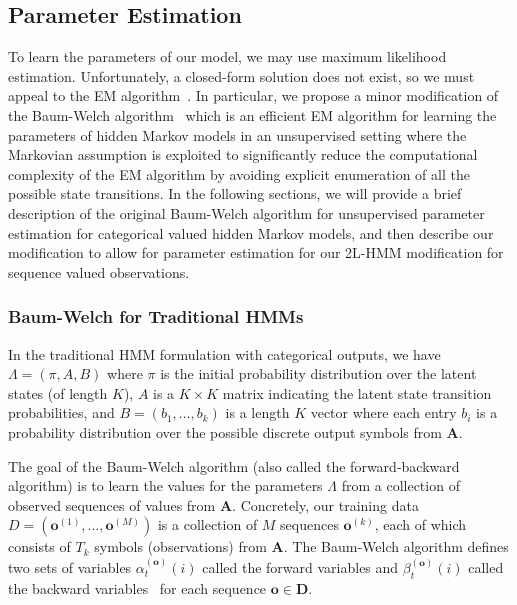 \subsection{Parameter Estimation}
\label{sec:param-estimation}
To learn the parameters of our model, we may use maximum
likelihood estimation. Unfortunately, a closed-form solution does not
exist, so we must appeal to the EM algorithm~\cite{Dempster:1977:JRSS}. In
particular, we propose a minor modification of the Baum-Welch
algorithm~\cite{Rabiner:1990:RSR} which is an efficient EM algorithm
for learning the parameters of
hidden Markov models in an unsupervised setting where the Markovian assumption is exploited
 to significantly reduce the computational complexity of the EM algorithm by avoiding explicit enumeration of all the possible state transitions.  In the following sections,
we will provide a brief description of the original Baum-Welch algorithm
for unsupervised parameter estimation for categorical valued hidden Markov
models, and then describe our modification to allow for parameter
estimation for our 2L-HMM modification for sequence valued observations.

\subsubsection{Baum-Welch for Traditional HMMs}
In the traditional HMM formulation with categorical outputs, we have
$\Lambda = (\pi, A, B)$ where $\pi$ is the initial probability distribution
over the latent states (of length $K$), $A$ is a $K\times K$ matrix
indicating the latent state transition probabilities, and $B = (b_1,
\ldots, b_k)$ is a length $K$ vector where each entry $b_i$ is a
probability distribution over the possible discrete output symbols from
$\mathbf{A}$.

The goal of the Baum-Welch algorithm (also called the forward-backward
algorithm) is to learn the values for the parameters $\Lambda$ from a
collection of observed sequences of values from $\mathbf{A}$. Concretely,
our training data $D = (\mathbf{o}^{(1)}, \ldots, \mathbf{o}^{(M)})$ is a
collection of $M$ sequences $\mathbf{o}^{(k)}$, each of which consists of $T_k$
symbols (observations) from $\mathbf{A}$. The Baum-Welch algorithm defines
two sets of variables $\alpha^{(\mathbf{o})}_t(i)$ called the forward
variables and $\beta^{(\mathbf{o})}_t(i)$ called the backward
variables~\cite{Rabiner:1990:RSR} for each sequence $\mathbf{o} \in
\mathbf{D}$.

